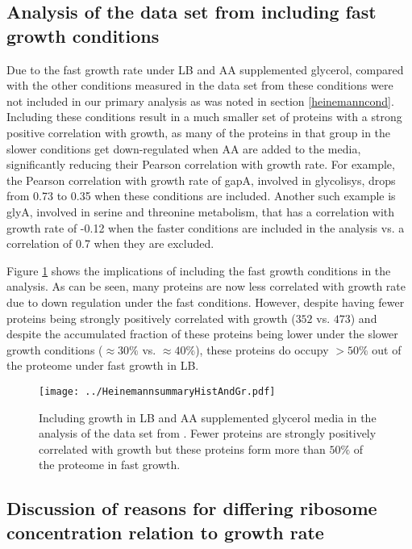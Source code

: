 \documentclass{article}
\newcommand{\hGlobal}{$473$}
\newcommand{\hGlobalLB}{$352$}
\begin{document}
\subsection{Analysis of the data set from \cite{Heinemann2015} including fast growth conditions}
\label{lbanalysis}
Due to the fast growth rate under LB and AA supplemented glycerol, compared with the other conditions measured in the data set from \cite{Heinemann2015} these conditions were not included in our primary analysis as was noted in section \ref{heinemanncond}.
Including these conditions result in a much smaller set of proteins with a strong positive correlation with growth, as many of the proteins in that group in the slower conditions get down-regulated when AA are added to the media, significantly reducing their Pearson correlation with growth rate.
For example, the Pearson correlation with growth rate of gapA, involved in glycolisys, drops from 0.73 to 0.35 when these conditions are included.
Another such example is glyA, involved in serine and threonine metabolism, that has a correlation with
growth rate of -0.12 when the faster conditions are included in the analysis vs. a correlation of 0.7 when they are excluded.

Figure \ref{fig:LB} shows the implications of including the fast growth conditions in the analysis.
As can be seen, many proteins are now less correlated with growth rate due to down regulation under the fast conditions.
However, despite having fewer proteins being strongly positively correlated with growth (\hGlobalLB{} vs. \hGlobal{}) and despite the accumulated fraction of these proteins being lower under the slower growth conditions ($\approx30\%$ vs. $\approx40\%$), these proteins do occupy $>50\%$ out of the proteome under fast growth in LB.

\begin{figure}[H]
\begin{center}
\texttt{[image: ../HeinemannsummaryHistAndGr.pdf]}
\caption{\label{fig:LB}
Including growth in LB and AA supplemented glycerol media in the analysis of the data set from \cite{Heinemann2015}.
Fewer proteins are strongly positively correlated with growth but these proteins form more than $50\%$ of the proteome in fast growth.%
}
\end{center}
\end{figure}

\subsection{Discussion of reasons for differing ribosome concentration relation to growth rate}
\label{ribosomeconc} 
\end{document}
